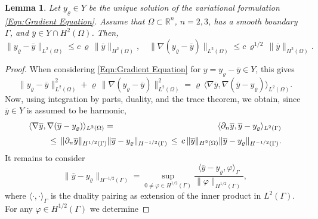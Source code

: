 \documentclass{article}
\newtheorem{lemma}{Lemma}
\numberwithin{equation}{section}
\begin{document}
\begin{lemma}\label{Lemma:Regularization error smooth}
  Let $ y_\varrho \in Y$ be the unique solution of the variational formulation
  \eqref{Eqn:Gradient Equation}. Assume that $\Omega \subset {\mathbb{R}}^n$,
  $n=2,3$, has a smooth boundary $\Gamma$, and
  $\overline{y} \in Y \cap H^2(\Omega)$. Then,
  \begin{equation}\label{Eqn:Regularization error regular smooth}
    \| y_\varrho - \overline{y} \|_{L^2(\Omega)} \leq
    c \, \varrho \, \| \overline{y} \|_{H^2(\Omega)},
    \quad
    \| \nabla (y_\varrho - \overline{y}) \|_{L^2(\Omega)}
    \leq
    c \, \varrho^{1/2} \, \| \overline{y} \|_{H^2(\Omega)} .
  \end{equation}
\end{lemma}

\begin{proof}
  When considering \eqref{Eqn:Gradient Equation} for
  $y = y_\varrho - \overline{y} \in Y$, this gives
  \begin{equation}\label{Lemma 1 Step 1}
    \| y_\varrho - \overline{y} \|^2_{L^2(\Omega)}
    + \varrho \, \| \nabla (y_\varrho - \overline{y}) \|^2_{L^2(\Omega)}   
    =
    \varrho \, \langle \nabla \overline{y} ,
    \nabla (\overline{y} - y_\varrho) \rangle_{L^2(\Omega)} .
  \end{equation}
  Now, using integration by parts, duality, and the trace theorem, we obtain,
  since $\overline{y} \in Y$ is assumed to be harmonic,
  \begin{eqnarray*}
    \langle \nabla \overline{y} ,
    \nabla (\overline{y} - y_\varrho) \rangle_{L^2(\Omega)}
    & = & \langle \partial_n \overline{y} , \overline{y} - y_\varrho
          \rangle_{L^2(\Gamma)} \\[1mm]
    && \hspace*{-3cm}
       \leq \, \| \partial_n \overline{y} \|_{H^{1/2}(\Gamma)}
       \| \overline{y} - y_\varrho \|_{H^{-1/2}(\Gamma)} \, \leq \,
       c \, \| \overline{y} \|_{H^2(\Omega)}
       \| \overline{y} - y_\varrho \|_{H^{-1/2}(\Gamma)} .
  \end{eqnarray*}
  It remains to consider
  \[
    \| \overline{y} - y_\varrho \|_{H^{-1/2}(\Gamma)}
    = \sup\limits_{0 \neq \varphi \in H^{1/2}(\Gamma)}
    \frac{\langle \overline{y}-y_\varrho , \varphi
      \rangle_\Gamma}{\| \varphi \|_{H^{1/2}(\Gamma)}},
  \]
  where $\langle \cdot , \cdot \rangle_\Gamma$ is the duality pairing
  as extension of the inner product in $L^2(\Gamma)$.
  For any $\varphi \in H^{1/2}(\Gamma)$ we determine

\end{proof}
\end{document}
